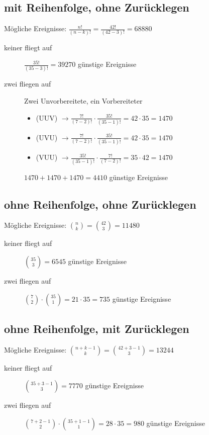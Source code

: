 \documentclass[11pt, a4paper]{article}
\begin{document}
\subsection{mit Reihenfolge, ohne Zurücklegen}
Mögliche Ereignisse: $\frac{n!}{(n-k)!} = \frac{42!}{(42-3)!} = 68880$
\begin{description}
	\item[keiner fliegt auf] $\frac{35!}{(35-3)!} = 39270$ günstige Ereignisse
	\item[zwei fliegen auf] Zwei Unvorbereitete, ein Vorbereiteter
		\begin{itemize}
			\item (UUV) $\rightarrow \frac{7!}{(7-2)!} \cdot \frac{35!}{(35-1)!} = 42 \cdot 35 = 1470$
			\item (UVU) $\rightarrow \frac{7!}{(7-2)!} \cdot \frac{35!}{(35-1)!} = 42 \cdot 35 = 1470$
			\item (VUU) $\rightarrow \frac{35!}{(35-1)!} \cdot \frac{7!}{(7-2)!} = 35 \cdot 42 = 1470$
		\end{itemize}
		$1470 + 1470 + 1470 = 4410$ günstige Ereignisse
\end{description}

\subsection{ohne Reihenfolge, ohne Zurücklegen}
Mögliche Ereignisse: $\binom{n}{k} = \binom{42}{3} = 11480$
\begin{description}
	\item[keiner fliegt auf] $\binom{35}{3} = 6545$  günstige Ereignisse
	\item[zwei fliegen auf] $\binom{7}{2} \cdot \binom{35}{1} = 21 \cdot 35 = 735$  günstige Ereignisse
\end{description}

\subsection{ohne Reihenfolge, mit Zurücklegen}
Mögliche Ereignisse: $\binom{n+k-1}{k} = \binom{42+3-1}{3} = 13244$
\begin{description}
	\item[keiner fliegt auf] $\binom{35+3-1}{3} = 7770$ günstige Ereignisse
	\item[zwei fliegen auf] $\binom{7+2-1}{2} \cdot \binom{35+1-1}{1} = 28 \cdot 35 = 980$ günstige Ereignisse
\end{description}

\newpage
\end{document}
